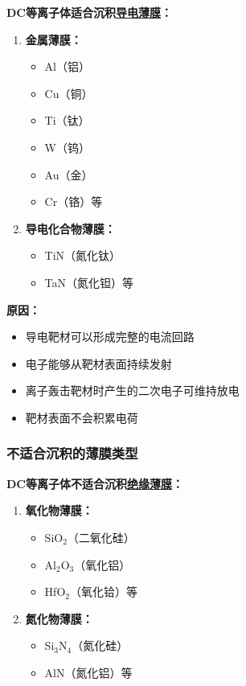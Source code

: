\documentclass[UTF8,12pt,a4paper]{ctexart}
\begin{document}
\textbf{DC等离子体适合沉积\underline{导电薄膜}：}

\begin{enumerate}
    \item \textbf{金属薄膜：}
    \begin{itemize}
        \item Al（铝）
        \item Cu（铜）
        \item Ti（钛）
        \item W（钨）
        \item Au（金）
        \item Cr（铬）等
    \end{itemize}
    
    \item \textbf{导电化合物薄膜：}
    \begin{itemize}
        \item TiN（氮化钛）
        \item TaN（氮化钽）等
    \end{itemize}
\end{enumerate}

\textbf{原因：}
\begin{itemize}
    \item 导电靶材可以形成完整的电流回路
    \item 电子能够从靶材表面持续发射
    \item 离子轰击靶材时产生的二次电子可维持放电
    \item 靶材表面不会积累电荷
\end{itemize}

\subsubsection{不适合沉积的薄膜类型}

\textbf{DC等离子体不适合沉积\underline{绝缘薄膜}：}

\begin{enumerate}
    \item \textbf{氧化物薄膜：}
    \begin{itemize}
        \item SiO$_2$（二氧化硅）
        \item Al$_2$O$_3$（氧化铝）
        \item HfO$_2$（氧化铪）等
    \end{itemize}
    
    \item \textbf{氮化物薄膜：}
    \begin{itemize}
        \item Si$_3$N$_4$（氮化硅）
        \item AlN（氮化铝）等
    \end{itemize}
\end{enumerate}
\end{document}
